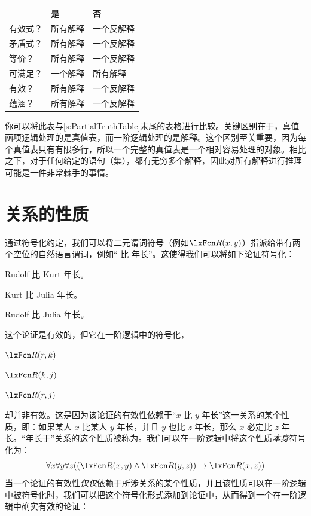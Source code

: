 \begin{center}\small
\begin{tabular}{l l l}
 & \textbf{是} & \textbf{否}\\
 \hline
有效式？ & 所有解释 & 一个反解释\\
矛盾式？ & 所有解释 & 一个反解释\\
等价？ & 所有解释 & 一个反解释\\
可满足？ & 一个解释 & 所有解释\\
有效？ & 所有解释 & 一个反解释\\
蕴涵？ & 所有解释 & 一个反解释\\
\end{tabular}
\end{center}


\label{table.ModelOrArgument}

你可以将此表与\cref{s:PartialTruthTable}末尾的表格进行比较。关键区别在于，真值函项逻辑处理的是真值表，而一阶逻辑处理的是解释。这个区别至关重要，因为每个真值表只有有限多行，所以一个完整的真值表是一个相对容易处理的对象。相比之下，对于任何给定的语句（集），都有无穷多个解释，因此对所有解释进行推理可能是一件非常棘手的事情。

\chapter{关系的性质}\label{ch:PropRelations}

通过符号化约定，我们可以将二元谓词符号（例如$\atom{R}{x,y}$）指派给带有两个空位的自然语言谓词，例如“ 比  年长”。这使得我们可以将如下论证符号化：


\begin{earg}
	\item Rudolf 比 Kurt 年长。
	\item Kurt 比 Julia 年长。
	\item[\texttherefore] Rudolf 比 Julia 年长。
\end{earg}


这个论证是有效的，但它在一阶逻辑中的符号化，


\begin{earg}
	\item $\atom{R}{r,k}$
	\item $\atom{R}{k,j}$
	\item[\texttherefore] $\atom{R}{r,j}$
\end{earg}


却并非有效。这是因为该论证的有效性依赖于“$x$ 比 $y$ 年长”这一关系的某个性质，即：如果某人 $x$ 比某人 $y$ 年长，并且 $y$ 也比 $z$ 年长，那么 $x$ 必定比 $z$ 年长。“年长于”关系的这个性质被称为。我们可以在一阶逻辑中将这个性质\emph{本身}符号化为：
\[
	\forall x\forall y\forall z((\atom{R}{x,y} \eand \atom{R}{y,z}) \eif
	\atom{R}{x,z})
\]
当一个论证的有效性\emph{仅仅}依赖于所涉关系的某个性质，并且该性质可以在一阶逻辑中被符号化时，我们可以把这个符号化形式添加到论证中，从而得到一个在一阶逻辑中确实有效的论证：


